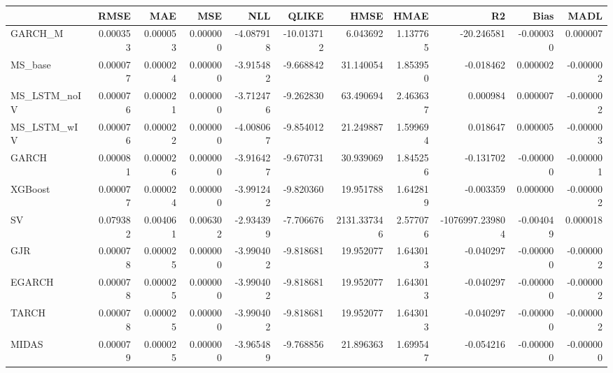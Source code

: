 \begin{tabular}{lrrrrrrrrrr}
\toprule
 & RMSE & MAE & MSE & NLL & QLIKE & HMSE & HMAE & R2 & Bias & MADL \\
\midrule
GARCH_M & 0.000353 & 0.000053 & 0.000000 & -4.087918 & -10.013712 & 6.043692 & 1.137765 & -20.246581 & -0.000030 & 0.000007 \\
MS_base & 0.000077 & 0.000024 & 0.000000 & -3.915482 & -9.668842 & 31.140054 & 1.853950 & -0.018462 & 0.000002 & -0.000002 \\
MS_LSTM_noIV & 0.000076 & 0.000021 & 0.000000 & -3.712476 & -9.262830 & 63.490694 & 2.463637 & 0.000984 & 0.000007 & -0.000002 \\
MS_LSTM_wIV & 0.000076 & 0.000022 & 0.000000 & -4.008067 & -9.854012 & 21.249887 & 1.599694 & 0.018647 & 0.000005 & -0.000003 \\
GARCH & 0.000081 & 0.000026 & 0.000000 & -3.916427 & -9.670731 & 30.939069 & 1.845256 & -0.131702 & -0.000000 & -0.000001 \\
XGBoost & 0.000077 & 0.000024 & 0.000000 & -3.991242 & -9.820360 & 19.951788 & 1.642819 & -0.003359 & 0.000000 & -0.000002 \\
SV & 0.079382 & 0.004061 & 0.006302 & -2.934399 & -7.706676 & 2131.337346 & 2.577076 & -1076997.239804 & -0.004049 & 0.000018 \\
GJR & 0.000078 & 0.000025 & 0.000000 & -3.990402 & -9.818681 & 19.952077 & 1.643013 & -0.040297 & -0.000000 & -0.000002 \\
EGARCH & 0.000078 & 0.000025 & 0.000000 & -3.990402 & -9.818681 & 19.952077 & 1.643013 & -0.040297 & -0.000000 & -0.000002 \\
TARCH & 0.000078 & 0.000025 & 0.000000 & -3.990402 & -9.818681 & 19.952077 & 1.643013 & -0.040297 & -0.000000 & -0.000002 \\
MIDAS & 0.000079 & 0.000025 & 0.000000 & -3.965489 & -9.768856 & 21.896363 & 1.699547 & -0.054216 & -0.000000 & -0.000000 \\
\bottomrule
\end{tabular}
